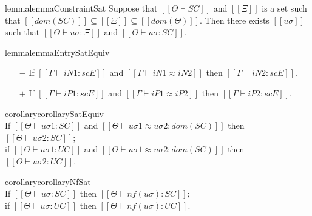 \begin{restatable}{lemma}{lemmaConstraintSat}
    \label{lemma:constraint-sat}
    Suppose that $[[Θ ⊢ SC]]$
    and $[[Ξ]]$ is a set such that
    $[[dom(SC)]] \subseteq [[Ξ]] \subseteq [[dom(Θ)]]$.
    Then there exists 
    $[[uσ]]$ such that 
    $[[ Θ  ⊢ uσ : Ξ ]]$ and
    $[[ Θ  ⊢ uσ : SC ]]$.
\end{restatable}

\begin{restatable}{lemma}{lemmaEntrySatEquiv}
    \label{lemma:entry-sat-equiv}
    \begin{itemize}
        \item [$-$] If $[[Γ ⊢ iN1 : scE]]$ and $[[Γ ⊢ iN1 ≈ iN2]]$ then $[[Γ ⊢ iN2 : scE]]$.
        \item [$+$] If $[[Γ ⊢ iP1 : scE]]$ and $[[Γ ⊢ iP1 ≈ iP2]]$ then $[[Γ ⊢ iP2 : scE]]$.
    \end{itemize}
\end{restatable}

\begin{restatable}{corollary}{corollarySatEquiv}
    \label{corollary:sat-equiv}
    \hfill\\
    If $[[ Θ ⊢ uσ1 : SC ]]$ and $[[Θ ⊢ uσ1 ≈ uσ2 : dom(SC) ]]$ then $[[ Θ ⊢ uσ2 : SC ]]$;\\
    if $[[ Θ ⊢ uσ1 : UC ]]$ and $[[Θ ⊢ uσ1 ≈ uσ2 : dom(SC) ]]$ then $[[ Θ ⊢ uσ2 : UC ]]$.
\end{restatable}

\begin{restatable}{corollary}{corollaryNfSat}
    \label{corollary:nf-sat}
    \hfill\\
    If $[[Θ ⊢ uσ : SC]]$ then $[[Θ  ⊢ nf(uσ) : SC]]$;\\
    if $[[Θ ⊢ uσ : UC]]$ then $[[Θ  ⊢ nf(uσ) : UC]]$.
\end{restatable}
